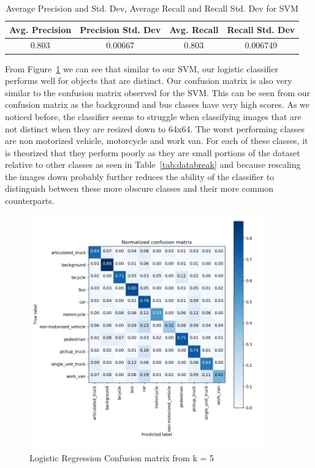 \documentclass[12pt]{article}
\begin{document}
\begin{table}[H]
\centering
\begin{tabular}{|c|c|c|c|}
\hline
Avg. Precision & Precision Std. Dev & Avg. Recall & Recall Std. Dev \\ \hline
0.803 & 0.00667 & 0.803 & 0.006749 \\ \hline
\end{tabular}
\caption{Average Precision and Std. Dev, Average Recall and Recall Std. Dev for SVM}\label{tab:prec_rec}
\end{table}

From Figure~\ref{fig:plots/confusion_5_log_reg} we can see that similar to our SVM, our logistic classifier performs well for objects that are distinct. Our confusion matrix is also very similar to the confusion matrix observed for the SVM. This can be seen from our confusion matrix as the background and bus classes have very high scores. As we noticed before, the classifier seems to struggle when classifying images that are not distinct when they are resized down to 64x64. The worst performing classes are non motorized vehicle, motorcycle and work van. For each of these classes, it is theorized that they perform poorly as they are small portions of the dataset relative to other classes as seen in Table~\ref{tab:databreak} and because rescaling the images down probably further reduces the ability of the classifier to distinguish between these more obscure classes and their more common counterparts. 

\begin{figure}[!htb]
    \centering
    \includegraphics[width=0.9\textwidth]{plots/confusion_5_log_reg.jpg}
    \caption{Logistic Regression Confusion matrix from k = 5}
    \label{fig:plots/confusion_5_log_reg}
\end{figure}
\end{document}
